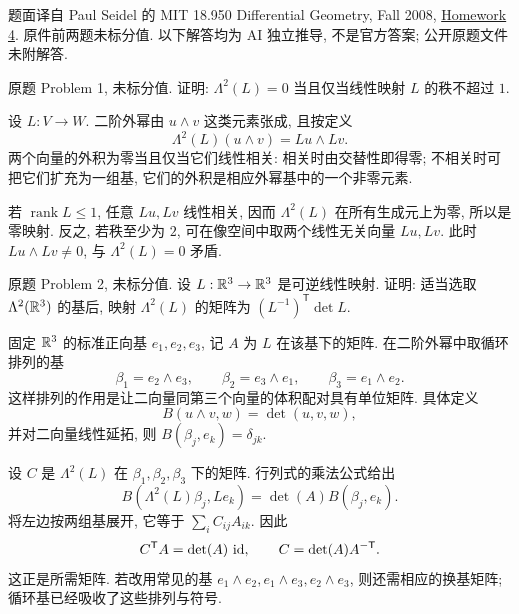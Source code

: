 \par{}
题面译自 Paul Seidel 的 MIT 18.950 Differential Geometry, Fall 2008,
\href{https://ocw.mit.edu/courses/18-950-differential-geometry-fall-2008/resources/homework4/}{Homework 4}.
原件前两题未标分值. 以下解答均为 AI 独立推导, 不是官方答案; 公开原题文件未附解答.

\begin{exercise}\label{ps:4-1}
原题 Problem 1, 未标分值. 证明: $\Lambda^2(L)=0$ 当且仅当线性映射 $L$ 的秩不超过 $1$.
\end{exercise}
\begin{solution}
设 $L:V\to W$. 二阶外幂由 $u\wedge v$ 这类元素张成, 且按定义
\[
 \Lambda^2(L)(u\wedge v)=Lu\wedge Lv.
\]
两个向量的外积为零当且仅当它们线性相关: 相关时由交替性即得零; 不相关时可把它们扩充为一组基, 它们的外积是相应外幂基中的一个非零元素.

若 $\operatorname{rank}L\le1$, 任意 $Lu,Lv$ 线性相关, 因而 $\Lambda^2(L)$ 在所有生成元上为零, 所以是零映射. 反之, 若秩至少为 $2$, 可在像空间中取两个线性无关向量 $Lu,Lv$. 此时 $Lu\wedge Lv\ne0$, 与 $\Lambda^2(L)=0$ 矛盾.
\end{solution}

\begin{exercise}\label{ps:4-2}
原题 Problem 2, 未标分值. 设 $L:\mathbb R^3\to\mathbb R^3$ 是可逆线性映射. 证明: 适当选取 $\Lambda^2(\mathbb R^3)$ 的基后, 映射 $\Lambda^2(L)$ 的矩阵为 $(L^{-1})^{\mathsf T}\det L$.
\end{exercise}
\begin{solution}
固定 $\mathbb R^3$ 的标准正向基 $e_1,e_2,e_3$, 记 $A$ 为 $L$ 在该基下的矩阵. 在二阶外幂中取循环排列的基
\[
 \beta_1=e_2\wedge e_3,\qquad
 \beta_2=e_3\wedge e_1,\qquad
 \beta_3=e_1\wedge e_2.
\]
这样排列的作用是让二向量同第三个向量的体积配对具有单位矩阵. 具体定义
\[
 B(u\wedge v,w)=\det(u,v,w),
\]
并对二向量线性延拓, 则 $B(\beta_j,e_k)=\delta_{jk}$.

设 $C$ 是 $\Lambda^2(L)$ 在 $\beta_1,\beta_2,\beta_3$ 下的矩阵. 行列式的乘法公式给出
\[
 B(\Lambda^2(L)\beta_j,Le_k)=\det(A)B(\beta_j,e_k).
\]
将左边按两组基展开, 它等于 $\sum_i C_{ij}A_{ik}$. 因此
\[
 C^{\mathsf T}A=\det(A)\,\operatorname{id},\qquad
 C=\det(A)A^{-\mathsf T}.
\]
这正是所需矩阵. 若改用常见的基 $e_1\wedge e_2,e_1\wedge e_3,e_2\wedge e_3$, 则还需相应的换基矩阵; 循环基已经吸收了这些排列与符号.
\end{solution}

